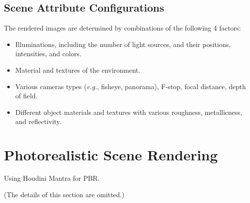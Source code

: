 \documentclass[10pt]{article}
\newcommand{\Eg}{\textit{e.g.}}
\begin{document}
\subsection{Scene Attribute Configurations}%
\label{sec:configuration}
The rendered images are determined by combinations of the following 4 factors:
%
\begin{itemize}
  \item Illuminations, including the number of light sources, and their
    positions, intensities, and colors.
  \item Material and textures of the environment.
  \item Various cameras types (\Eg, fisheye, panorama), F-stop, focal distance,
    depth of field.
  \item Different object materials and textures with various roughness,
    metallicness, and reflectivity.
\end{itemize}


\section{Photorealistic Scene Rendering}%
\label{sec:rendering}
Using Houdini Mantra for PBR\@.

(The details of this section are omitted.)
\end{document}
